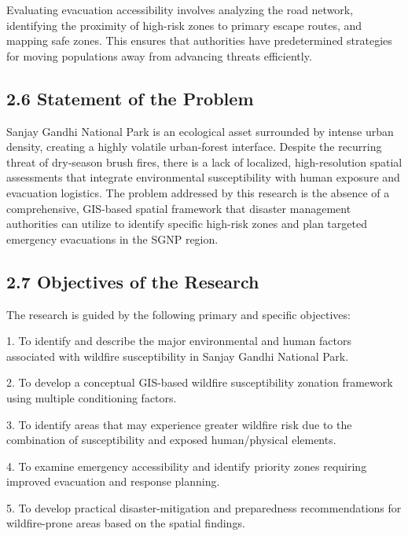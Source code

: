 \documentclass[12pt,a4paper]{article}
\begin{document}
Evaluating evacuation accessibility involves analyzing the road network, identifying the proximity of high-risk zones to primary escape routes, and mapping safe zones. This ensures that authorities have predetermined strategies for moving populations away from advancing threats efficiently.



\subsection*{2.6 Statement of the Problem}

Sanjay Gandhi National Park is an ecological asset surrounded by intense urban density, creating a highly volatile urban-forest interface. Despite the recurring threat of dry-season brush fires, there is a lack of localized, high-resolution spatial assessments that integrate environmental susceptibility with human exposure and evacuation logistics. The problem addressed by this research is the absence of a comprehensive, GIS-based spatial framework that disaster management authorities can utilize to identify specific high-risk zones and plan targeted emergency evacuations in the SGNP region.



\subsection*{2.7 Objectives of the Research}

The research is guided by the following primary and specific objectives:


1. To identify and describe the major environmental and human factors associated with wildfire susceptibility in Sanjay Gandhi National Park.


2. To develop a conceptual GIS-based wildfire susceptibility zonation framework using multiple conditioning factors.


3. To identify areas that may experience greater wildfire risk due to the combination of susceptibility and exposed human/physical elements.


4. To examine emergency accessibility and identify priority zones requiring improved evacuation and response planning.


5. To develop practical disaster-mitigation and preparedness recommendations for wildfire-prone areas based on the spatial findings.
\end{document}
